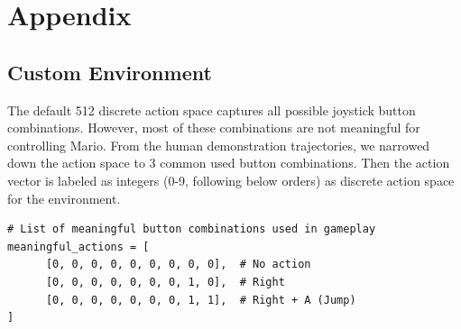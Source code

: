 \documentclass{article}
\begin{document}
\clearpage



\clearpage
\appendix
\renewcommand{\thefigure}{A\arabic{figure}}
\renewcommand{\thetable}{A\arabic{table}}
\setcounter{figure}{0}
\setcounter{table}{0}
\onecolumn
\section{Appendix}
\subsection{Custom Environment}
\label{a1:custom_env}

The default 512 discrete action space captures all possible joystick button 
combinations. However, most of these combinations are not meaningful for 
controlling Mario. From the human demonstration trajectories, we narrowed down 
the action space to 3 common used button combinations.
Then the action vector is labeled as integers (0-9, following below orders)
as discrete action space for the environment.

\begin{verbatim}
# List of meaningful button combinations used in gameplay
meaningful_actions = [
      [0, 0, 0, 0, 0, 0, 0, 0, 0],  # No action
      [0, 0, 0, 0, 0, 0, 0, 1, 0],  # Right
      [0, 0, 0, 0, 0, 0, 0, 1, 1],  # Right + A (Jump)
]
\end{verbatim}
\end{document}
